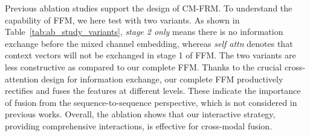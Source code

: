 \documentclass[journal]{IEEEtran}
\begin{document}
Previous ablation studies support the design of CM-FRM.
To understand the capability of FFM, we here test with two variants.
As shown in Table~\ref{tab:ab_study_variants}, \emph{stage 2 only} means there is no information exchange before the mixed channel embedding, whereas \emph{self attn} denotes that context vectors will not be exchanged in stage 1 of FFM. 
The two variants are less constructive as compared to our complete FFM. Thanks to the crucial cross-attention design for information exchange, our complete FFM productively rectifies and fuses the features at different levels. These indicate the importance of fusion from the sequence-to-sequence perspective, which is not considered in previous works.
Overall, the ablation shows that our interactive strategy, providing comprehensive interactions, is effective for cross-modal fusion.
\end{document}
